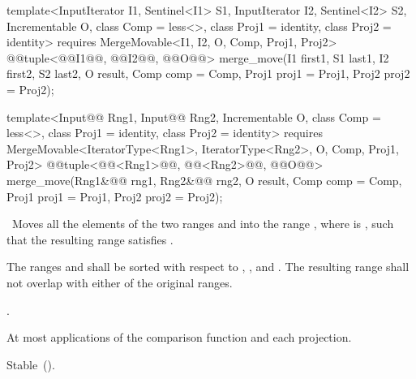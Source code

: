 \begin{addedblock}
%
\begin{itemdecl}
template<InputIterator I1, Sentinel<I1> S1, InputIterator I2, Sentinel<I2> S2,
    Incrementable O, class Comp = less<>, class Proj1 = identity,
    class Proj2 = identity>
  requires MergeMovable<I1, I2, O, Comp, Proj1, Proj2>
  @@tuple<@@I1@\newtxt{)}@, @@I2@\newtxt{)}@, @@O@\newtxt{)}@>
    merge_move(I1 first1, S1 last1, I2 first2, S2 last2, O result,
          Comp comp = Comp{}, Proj1 proj1 = Proj1{}, Proj2 proj2 = Proj2{});

template<Input@@ Rng1, Input@@ Rng2, Incrementable O, class Comp = less<>,
    class Proj1 = identity, class Proj2 = identity>
  requires MergeMovable<IteratorType<Rng1>, IteratorType<Rng2>, O, Comp, Proj1, Proj2>
  @@tuple<@@<Rng1>@\newtxt{)}@,
               @@<Rng2>@\newtxt{)}@,
               @@O@\newtxt{)}@>
    merge_move(Rng1&@\newtxt{\&}@ rng1, Rng2&@\newtxt{\&}@ rng2, O result,
          Comp comp = Comp{}, Proj1 proj1 = Proj1{}, Proj2 proj2 = Proj2{});
\end{itemdecl}

\begin{itemdescr}
\pnum
\effects\ Moves all the elements of the two ranges  and
 into the range , where 
is , such that the resulting range satisfies
.

\pnum
\requires The ranges  and  shall be
sorted with respect to , , and .
The resulting range shall not overlap with either of the original ranges.

\pnum
\returns
{}.

\pnum
\complexity
At most
applications of the comparison function and each projection.

\pnum
\remarks Stable~().
\end{itemdescr}
\end{addedblock}

